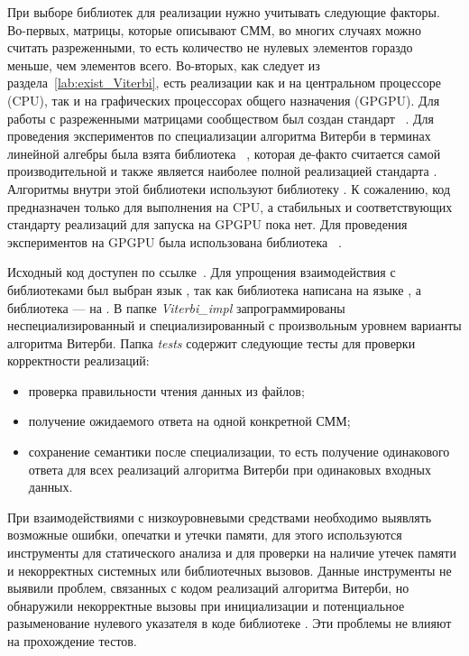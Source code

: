 При выборе библиотек для реализации нужно учитывать следующие 
факторы.
Во-первых, матрицы, которые описывают СММ, во многих случаях 
можно считать разреженными, то есть количество не нулевых 
элементов гораздо меньше, чем элементов всего.
Во-вторых, как следует из раздела~\ref{lab:exist_Viterbi}, 
есть реализации как и на центральном процессоре (CPU), так и 
на графических процессорах общего назначения (GPGPU).
Для работы с разреженными матрицами сообществом был создан 
стандарт ~\cite{GraphBLAS}.
Для проведения экспериментов по специализации алгоритма 
Витерби в терминах линейной алгебры была взята библиотека 
~\cite{SuiteSparse}, 
которая де-факто считается самой производительной и также 
является наиболее полной реализацией стандарта 
.
Алгоритмы внутри этой библиотеки используют библиотеку 
.
К сожалению, код  
предназначен только для выполнения на CPU, а стабильных и 
соответствующих стандарту  реализаций для 
запуска на GPGPU пока нет.
Для проведения экспериментов на GPGPU была использована 
библиотека ~\cite{CUSP}.

Исходный код доступен по ссылке~\cite{repo}.
Для упрощения взаимодействия с библиотеками был выбран язык 
\CPP, так как библиотека  
написана на языке , а библиотека  --- на \CPP.
В папке \emph{Viterbi\_impl} запрограммированы
неспециализированный и специализированный с произвольным 
уровнем варианты алгоритма Витерби.
Папка \emph{tests} содержит следующие тесты для проверки 
корректности реализаций:
\begin{itemize}
	\item проверка правильности чтения данных из файлов;
	\item получение ожидаемого ответа на одной конкретной СММ;
	\item сохранение семантики после специализации, то есть 
	получение одинакового ответа для всех реализаций 
	алгоритма Витерби при одинаковых входных данных.
\end{itemize} 
При взаимодействиями с низкоуровневыми средствами
необходимо выявлять возможные ошибки, опечатки и утечки 
памяти, для этого используются инструменты  
для статического анализа и  для проверки на 
наличие утечек памяти и некорректных системных или 
библиотечных вызовов.
Данные инструменты не выявили проблем, связанных с кодом 
реализаций алгоритма Витерби, но обнаружили некорректные 
вызовы при инициализации  и потенциальное 
разыменование нулевого указателя в коде библиотеке .
Эти проблемы не влияют на прохождение тестов.